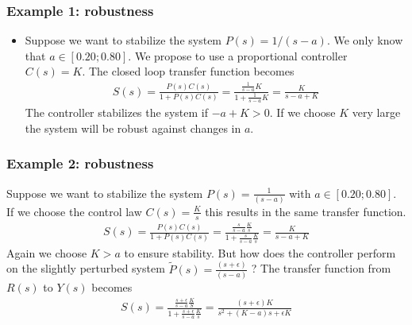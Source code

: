 \begin{frame}
	\frametitle{Example 1: robustness}
	\begin{itemize}
		\item Suppose we want to stabilize the system $P(s)=1/(s - a)$.  We only know that $a \in [0.20;0.80]$. We propose to use a proportional controller $C(s)=K$.
		The closed loop transfer function becomes
		\begin{align*}
			S(s) = \frac{P(s)C(s)}{1+P(s)C(s)} = \frac{\frac{1}{s-a}K}{1+\frac{1}{s-a}K} = \frac{K}{s-a+K}
		\end{align*}
		The controller stabilizes the system if $−a+K>0$. If we choose $K$ very large the system will be robust against changes in $a$.
		
	\end{itemize}
\end{frame}


\begin{frame}
	\frametitle{Example 2: robustness}
	Suppose we want to stabilize the system $P(s)=\frac{1}{(s - a)}$ with $a\in[0.20;0.80]$. If we choose the control law $C(s)=\frac{K}{s}$ this results in the same transfer function.
	\begin{align*}
		S(s) = \frac{P(s)C(s)}{1+P(s)C(s)} = \frac{\frac{s}{s-a}\frac{K}{s}}{1+\frac{s}{s-a} \frac{K}{s}} = \frac{K}{s-a+K}
	\end{align*}
	Again we choose $K>a$ to ensure stability.
	But how does the controller perform on the slightly perturbed system $\tilde{P}(s)=\frac{(s+\epsilon)}{(s - a)}$  ?
	The transfer function from $R(s)$ to $Y(s)$ becomes
	\begin{align*}
		S(s) = \frac{\frac{s+\epsilon}{s-a} \frac{K}{S}}{1+\frac{s+\epsilon}{s-a}\frac{K}{s}}
		= \frac{(s+\epsilon)K}{s^2 + (K-a)s + \epsilon K}
	\end{align*}
\end{frame}

